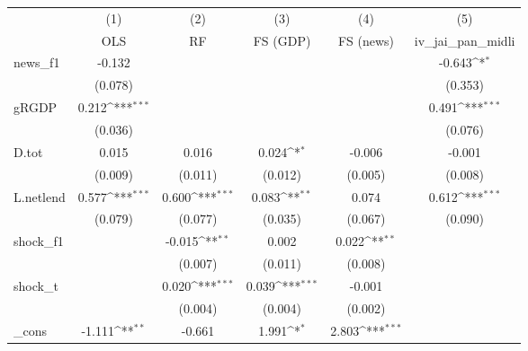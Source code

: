 {
\def\sym#1{\ifmmode^{#1}\else\(^{#1}\)\fi}
\begin{tabular}{l*{5}{c}}
\toprule
            &\multicolumn{1}{c}{(1)}&\multicolumn{1}{c}{(2)}&\multicolumn{1}{c}{(3)}&\multicolumn{1}{c}{(4)}&\multicolumn{1}{c}{(5)}\\
            &\multicolumn{1}{c}{OLS}&\multicolumn{1}{c}{RF}&\multicolumn{1}{c}{FS (GDP)}&\multicolumn{1}{c}{FS (news)}&\multicolumn{1}{c}{iv\_jai\_pan\_midli}\\
\midrule
news\_f1     &      -0.132         &                     &                     &                     &      -0.643\sym{*}  \\
            &     (0.078)         &                     &                     &                     &     (0.353)         \\
\addlinespace
gRGDP       &       0.212\sym{***}&                     &                     &                     &       0.491\sym{***}\\
            &     (0.036)         &                     &                     &                     &     (0.076)         \\
\addlinespace
D.tot       &       0.015         &       0.016         &       0.024\sym{*}  &      -0.006         &      -0.001         \\
            &     (0.009)         &     (0.011)         &     (0.012)         &     (0.005)         &     (0.008)         \\
\addlinespace
L.netlend   &       0.577\sym{***}&       0.600\sym{***}&       0.083\sym{**} &       0.074         &       0.612\sym{***}\\
            &     (0.079)         &     (0.077)         &     (0.035)         &     (0.067)         &     (0.090)         \\
\addlinespace
shock\_f1    &                     &      -0.015\sym{**} &       0.002         &       0.022\sym{**} &                     \\
            &                     &     (0.007)         &     (0.011)         &     (0.008)         &                     \\
\addlinespace
shock\_t     &                     &       0.020\sym{***}&       0.039\sym{***}&      -0.001         &                     \\
            &                     &     (0.004)         &     (0.004)         &     (0.002)         &                     \\
\addlinespace
\_cons      &      -1.111\sym{**} &      -0.661         &       1.991\sym{*}  &       2.803\sym{***}&                     \\

\end{tabular}}
